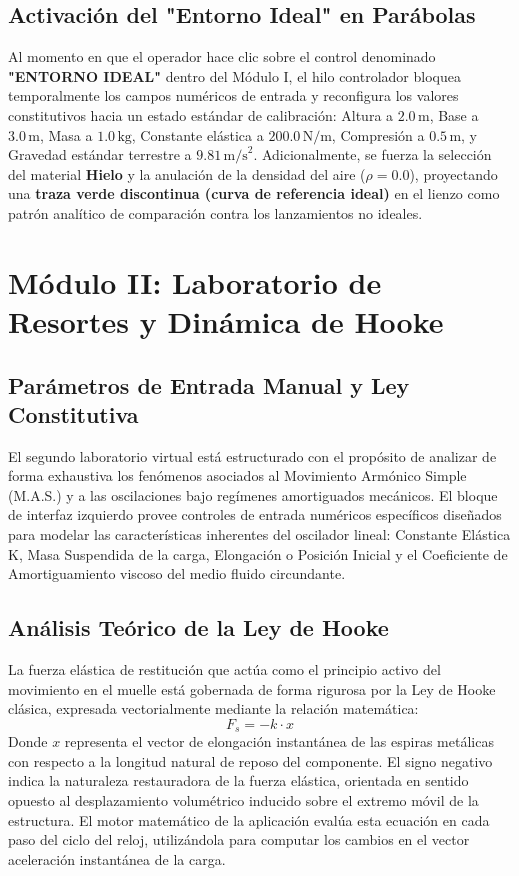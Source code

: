 \documentclass[11pt,a4paper]{article}
\begin{document}
	\subsection{\texorpdfstring{Activación del "Entorno Ideal" en Parábolas}{Activación del Entorno Ideal en Parábolas}}
	Al momento en que el operador hace clic sobre el control denominado \textbf{"ENTORNO IDEAL"} dentro del Módulo I, el hilo controlador bloquea temporalmente los campos numéricos de entrada y reconfigura los valores constitutivos hacia un estado estándar de calibración: Altura a $2.0\,\text{m}$, Base a $3.0\,\text{m}$, Masa a $1.0\,\text{kg}$, Constante elástica a $200.0\,\text{N/m}$, Compresión a $0.5\,\text{m}$, y Gravedad estándar terrestre a $9.81\,\text{m/s}^2$. Adicionalmente, se fuerza la selección del material \textbf{Hielo} y la anulación de la densidad del aire ($\rho = 0.0$), proyectando una \textbf{traza verde discontinua (curva de referencia ideal)} en el lienzo como patrón analítico de comparación contra los lanzamientos no ideales.
	\section{Módulo II: Laboratorio de Resortes y Dinámica de Hooke}
	
	\subsection{Parámetros de Entrada Manual y Ley Constitutiva}
	El segundo laboratorio virtual está estructurado con el propósito de analizar de forma exhaustiva los fenómenos asociados al Movimiento Armónico Simple (M.A.S.) y a las oscilaciones bajo regímenes amortiguados mecánicos. El bloque de interfaz izquierdo provee controles de entrada numéricos específicos diseñados para modelar las características inherentes del oscilador lineal: Constante Elástica K, Masa Suspendida de la carga, Elongación o Posición Inicial y el Coeficiente de Amortiguamiento viscoso del medio fluido circundante.
	
	\subsection{Análisis Teórico de la Ley de Hooke}
	La fuerza elástica de restitución que actúa como el principio activo del movimiento en el muelle está gobernada de forma rigurosa por la Ley de Hooke clásica, expresada vectorialmente mediante la relación matemática:
	\begin{equation}
		F_s = -k \cdot x
	\end{equation}
	Donde $x$ representa el vector de elongación instantánea de las espiras metálicas con respecto a la longitud natural de reposo del componente. El signo negativo indica la naturaleza restauradora de la fuerza elástica, orientada en sentido opuesto al desplazamiento volumétrico inducido sobre el extremo móvil de la estructura. El motor matemático de la aplicación evalúa esta ecuación en cada paso del ciclo del reloj, utilizándola para computar los cambios en el vector aceleración instantánea de la carga.
	
\end{document}
